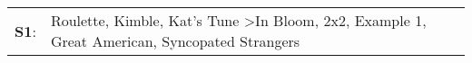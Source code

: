 \begin{supertabular}{p{0.03\textwidth}p{0.92\textwidth}}
 \textbf{S1}:  &  Roulette\textsuperscript{}, \enspace Kimble\textsuperscript{}, \enspace Kat's Tune\textsuperscript{} \textgreater \enspace In Bloom\textsuperscript{}, \enspace 2x2\textsuperscript{}, \enspace Example 1\textsuperscript{}, \enspace Great American\textsuperscript{}, \enspace Syncopated Strangers\textsuperscript{}  \enspace  \\
\end{supertabular}
